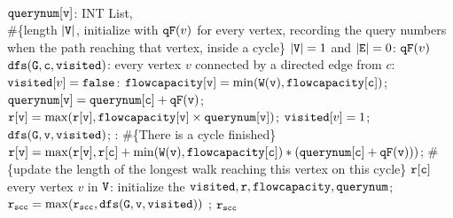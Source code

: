 \begin{algorithm}
\begin{algorithmic}[1]
            \\ \qquad  $\mathtt{querynum[v]}$: INT List,
            \\ \qquad  \#\{length $|\mathtt{V}|$, initialize with $\mathtt{qF}(v)$ for every vertex, 
            recording the query numbers when the path reaching 
            that vertex, inside a cycle\}
             $|\mathtt{V}| = 1$ and $|\mathtt{E}| = 0$:
            \STATE {}  $\mathtt{qF}(v)$
             {$\mathtt{dfs(G, c,visited)}$}:
            \STATE {} every vertex $v$ 
            connected by a directed edge from $c$:
            \STATE \qquad {} $\mathtt{visited}[v] = \mathtt{false}$:
            \STATE \qquad \qquad \qquad $\mathtt{flowcapacity[v] = \min(\mathtt{W}(v), {flowcapacity}[c])}$;
            \STATE \qquad \qquad \qquad $\mathtt{querynum[v] = querynum[c] + \mathtt{qF}(v)}$;
            \STATE \qquad \qquad \qquad $\mathtt{r[v] =  \max(r[v], flowcapacity[v] \times querynum[v]}) $; 
            \STATE \qquad \qquad \qquad  $\mathtt{visited}[v] = 1$; %
            \STATE \qquad \qquad \qquad $\mathtt{dfs(G, v, visited)}$;
            \STATE \qquad {}: \#\{There is a cycle finished\}
            \STATE \qquad \qquad \qquad 
            $\mathtt{r[v] =  \max(r[v], r[c] +  \min(\mathtt{W}(v), {flowcapacity}[c]) * (querynum[c] + \mathtt{qF}(v)))}$; \#\{update the length of the longest walk reaching this vertex on this cycle\}
            \STATE {}  $\mathtt{r[c]}$
             every vertex $v$ in $\mathtt{V}$:
            \STATE  \qquad initialize the $\mathtt{visited, r, flowcapacity, querynum}$;
            \STATE  \qquad $\mathtt{r_{scc} = \max(r_{scc}, dfs(G, v, \mathtt{visited} ))}$ ; 
            \RETURN  $\mathtt{r_{scc}}$
            \end{algorithmic}
            \end{algorithm}
